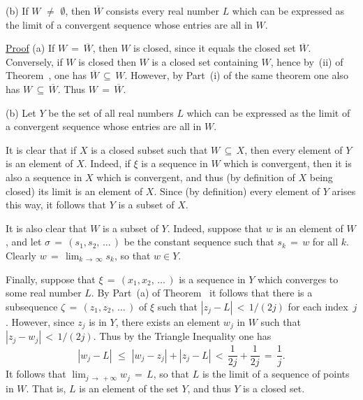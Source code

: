 {        (b) If $W \,\,{\neq}\,\, {\emptyset}$, then $\overline{W}$ consists every real number $L$ which can be expressed as the limit of a convergent sequence whose entries are all in $W$.

\V

        \underline{Proof} (a) If $W \,=\, \overline{W}$, then $W$ is closed, since it equals the closed set $\overline{W}$.
    Conversely, if $W$ is closed then $W$ is a closed set containing $W$, hence by~(ii) of Theorem~, one has $\overline{W} \,{\subseteq}\, W$.
    However, by Part~(i) of the same theorem one also has $W \,{\subseteq}\, \overline{W}$. Thus $W \,=\, \overline{W}$.

\V

        (b) Let $Y$ be the set of all real numbers $L$ which can be expressed as the limit of a convergent sequence whose entries are all in $W$.


        It is clear that if $X$ is a closed subset such that $W  \,{\subseteq}\,  X$, then every element of $Y$ is an element of $X$.
    Indeed, if ${\xi}$ is a sequence in $W$ which is convergent, then it is also a sequence in $X$ which is convergent, and thus (by definition of $X$ being closed) its limit is an element of $X$.
    Since (by definition) every element of $Y$ arises this way, it follows that $Y$ is a subset of $X$.

    It is also clear that $W$ is a subset of $Y$.
    Indeed, suppose that $w$ is an element of $W$, and let ${\sigma} \,=\, (s_{1},s_{2},\,{\ldots}\,)$ be the constant sequence such that $s_{k} \,=\, w$ for all $k$.
    Clearly $w \,=\, \lim_{k \,{\rightarrow}\, {\infty}} s_{k}$, so that $w{\in}Y$.
 
    Finally, suppose that ${\xi} \,=\, (x_{1},x_{2},\,{\ldots}\,)$ is a sequence in $Y$ which converges to some real number $L$.
    By Part~(a) of Theorem~ it follows that there is a subsequence ${\zeta} \,=\, (z_{1}, z_{2},\,{\ldots}\,)$ of ${\xi}$ such that $|z_{j}-L|\,<\,1/(2j)$ for each index~$j$.
    However, since $z_{j}$ is in $Y$, there exists an element $w_{j}$ in $W$ such that $|z_{j}-w_{j}|\,<\,1/(2j)$.
    Thus by the Triangle Inequality one has
        \begin{displaymath}
        \left|w_{j}-L\right|\,\,{\leq}\,\,|w_{j}-z_{j}| + |z_{j}-L|\,<\,\frac{1}{2j} + \frac{1}{2j} \,=\, \frac{1}{j}.
        \end{displaymath}
    It follows that $\lim_{j \,{\rightarrow}\, +{\infty}} w_{j} \,=\, L$, so that $L$ is the limit of a sequence of points in $W$.
    That is, $L$ is an element of the set $Y$, and thus $Y$ is a closed set.

}
